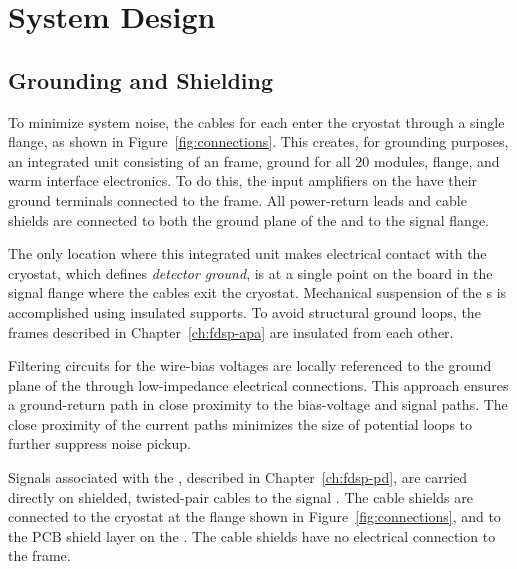 \section{System Design}
\label{sec:fdsp-tpcelec-design}
\subsection{Grounding and Shielding}
\label{sec:fdsp-tpcelec-design-grounding}


To minimize system noise, the  cables for each  enter 
the cryostat through a single  flange, as shown in Figure~\ref{fig:connections}. This creates, for grounding purposes, an integrated unit consisting of an  frame,  ground for all \num{20}  modules,  flange, and warm interface
electronics. To do this,
the input amplifiers on the   have their ground terminals connected to the  frame. 
All power-return leads and cable shields are connected to both the ground plane of the  and to the  signal flange.

The only location where this integrated unit makes electrical contact with the 
cryostat, which defines \textit{detector ground}, is at a single point on the  \fdth board in the  signal flange where the 
cables exit the cryostat. Mechanical suspension of the s is accomplished using insulated supports. 
To avoid structural ground loops, the  frames described in Chapter~\ref{ch:fdsp-apa} are 
insulated from each other.

Filtering circuits for the  wire-bias voltages are locally referenced to the ground plane of the  through low-impedance electrical connections. This approach ensures a ground-return path in close proximity to the bias-voltage and signal paths. The close proximity of the current paths minimizes the size of potential loops to further suppress noise pickup.

Signals associated with the , described in Chapter~\ref{ch:fdsp-pd}, are carried directly on shielded, 
twisted-pair cables to the signal \fdth. The cable shields are connected to the cryostat 
at the  flange shown in Figure~\ref{fig:connections}, and to the PCB  shield layer on the . The cable shields have no electrical connection to the  frame.

